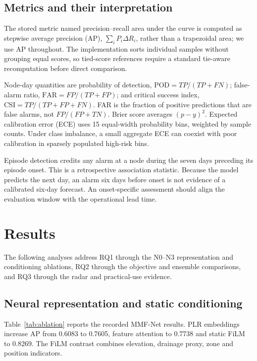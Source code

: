 \documentclass[conference]{IEEEtran}
\newcommand{\model}{MMF-Net}
\begin{document}
\subsection{Metrics and their interpretation}
The stored metric named precision--recall area under the curve is computed as
stepwise average precision (AP), $\sum_i P_i\Delta R_i$, rather than a
trapezoidal area; we use AP throughout. The implementation sorts individual
samples without grouping equal scores, so tied-score references require a
standard tie-aware recomputation before direct comparison.

Node-day quantities are probability of detection,
$\mathrm{POD}=TP/(TP+FN)$; false-alarm ratio,
$\mathrm{FAR}=FP/(TP+FP)$; and critical success index,
$\mathrm{CSI}=TP/(TP+FP+FN)$. FAR is the fraction of positive predictions that
are false alarms, not $FP/(FP+TN)$. Brier score averages $(p-y)^2$. Expected
calibration error (ECE) uses 15 equal-width probability bins, weighted by
sample counts. Under class imbalance, a small aggregate ECE can coexist with
poor calibration in sparsely populated high-risk bins.

Episode detection credits any alarm at a node during the seven days preceding
its episode onset. This is a retrospective association statistic. Because the
model predicts the next day, an alarm six days before onset is not evidence of
a calibrated six-day forecast. An onset-specific assessment should align the
evaluation window with the operational lead time.

\section{Results}
The following analyses address RQ1 through the N0--N3 representation and
conditioning ablations, RQ2 through the objective and ensemble comparisons,
and RQ3 through the radar and practical-use evidence.

\subsection{Neural representation and static conditioning}
Table~\ref{tab:ablation} reports the recorded \model{} results. PLR embeddings
increase AP from 0.6083 to 0.7605, feature attention to 0.7738 and static FiLM
to 0.8269. The FiLM contrast combines elevation, drainage proxy, zone and
position indicators.
\end{document}
